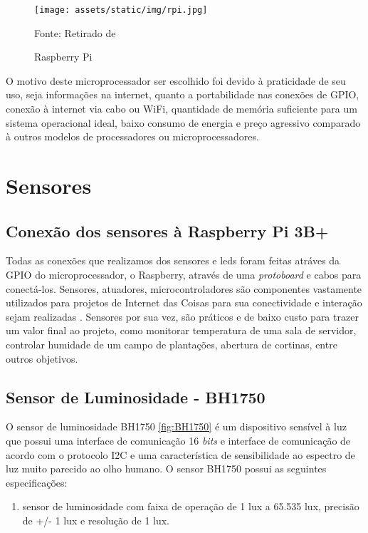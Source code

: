 \documentclass[../../layout.tex]{subfiles}
\begin{document}
\begin{figure}[H]
\centering
\caption{Raspberry Pi}
\texttt{[image: assets/static/img/rpi.jpg]}
\label{fig:rpi}

\begin{minipage}{0.5\textwidth}
\raggedright \footnotesize Fonte: Retirado de \cite{rpi}
\end{minipage}
\end{figure}

O motivo deste microprocessador ser escolhido foi devido à praticidade de seu uso, seja informações na internet, quanto a portabilidade nas conexões de GPIO, conexão à internet via cabo ou WiFi, quantidade de memória suficiente para um sistema operacional ideal, baixo consumo de energia e preço agressivo comparado à outros modelos de processadores ou microprocessadores.

\section{Sensores}

\subsection{Conexão dos sensores à Raspberry Pi 3B+}
Todas as conexões que realizamos dos sensores e leds foram feitas atráves da GPIO do microprocessador, o Raspberry, através de uma \emph{protoboard} e cabos para conectá-los.
Sensores, atuadores, microcontroladores são componentes vastamente utilizados para projetos de Internet das Coisas para sua conectividade e interação sejam realizadas \cite{sensores_iot}. Sensores por sua vez, são práticos e de baixo custo para trazer um valor final ao projeto, como monitorar temperatura de uma sala de servidor, controlar humidade de um campo de plantações, abertura de cortinas, entre outros objetivos.

\subsection{Sensor de Luminosidade - BH1750}
O sensor de luminosidade BH1750 \ref{fig:BH1750} é um dispositivo sensível à luz que possui uma interface de comunicação 16 \emph{bits} e interface de comunicação de acordo com o protocolo I2C e uma característica de sensibilidade ao espectro de luz muito parecido ao olho humano.
O sensor BH1750 possui as seguintes especificações:

\begin{enumerate}[label=\alph*)]
\itemsep0em
	\item sensor de luminosidade com faixa de operação de 1 lux a 65.535 lux, precisão de +/- 1 lux e resolução de 1 lux.
\end{enumerate}
\end{document}
